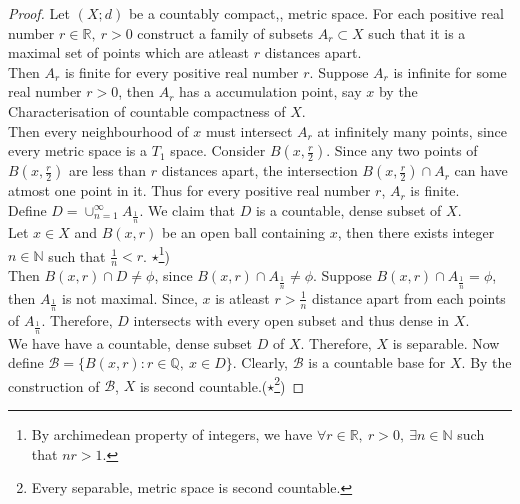 \begin{proof}
	Let $(X;d)$ be a countably compact,, metric space.
	For each positive real number $r \in \mathbb{R},\ r > 0$ construct a family of subsets $A_r \subset X$ such that it is a maximal set of points which are atleast $r$ distances apart.\\

	Then $A_r$ is finite for every positive real number $r$.
	Suppose $A_r$ is infinite for some real number $r > 0$, then $A_r$ has a accumulation point, say $x$ by the Characterisation of countable compactness of $X$.\\

	Then every neighbourhood of $x$ must intersect $A_r$ at infinitely many points, since every metric space is a $T_1$ space.
	Consider $B(x,\frac{r}{2})$.
	Since any two points of $B(x,\frac{r}{2})$ are less than $r$ distances apart, the intersection $B(x,\frac{r}{2}) \cap A_r$ can have atmost one point in it.
	Thus for every positive real number $r$, $A_r$ is finite.\\

	Define $D = \cup_{n = 1}^\infty A_\frac{1}{n}$.
	We claim that $D$ is a countable, dense subset of $X$.\\

	Let $x \in X$ and $B(x,r)$ be an open ball containing $x$, then there exists integer $n \in \mathbb{N}$ such that $\frac{1}{n} < r$.
	$\star$\footnote{By archimedean property of integers, we have $\forall r \in \mathbb{R},\ r>0,\ \exists n \in \mathbb{N}$ such that $nr > 1$.})\\

	Then $B(x,r) \cap D \ne \phi$, since $B(x,r) \cap A_\frac{1}{n} \ne \phi$.
	Suppose $B(x,r) \cap A_\frac{1}{n} = \phi$, then $A_\frac{1}{n}$ is not maximal.
	Since, $x$ is atleast $r > \frac{1}{n}$ distance apart from each points of $A_\frac{1}{n}$.
	Therefore, $D$ intersects with every open subset and thus dense in $X$.\\

	We have have a countable, dense subset $D$ of $X$.
	Therefore, $X$ is separable.
	Now define $\mathcal{B} = \{ B(x,r) : r \in \mathbb{Q},\ x \in D \}$.
	Clearly, $\mathcal{B}$ is a countable base for $X$.
	By the construction of $\mathcal{B}$, $X$ is second countable.($\star$\footnote{Every separable, metric space is second countable.})
\end{proof}

